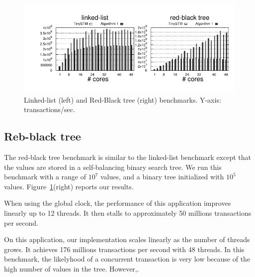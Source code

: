 \begin{figure}[!t]
	\centering
	\includegraphics[scale = 1.0]{results/intset/ll-rb.pdf}
	\caption{Linked-list (left) and Red-Black tree (right) benchmarks. Y-axis: transactions/sec. \label{fig:benchmarking:llrb}}
\end{figure}

\subsection{Reb-black tree}

The red-black tree benchmark is similar to the linked-list benchmark except that the values are stored in a self-balancing binary search tree. 
We run this benchmark with a range of $10^7$ values, and a binary tree initialized with $10^5$ values.
Figure~\ref{fig:benchmarking:llrb}(right) reports our results.

When using the global clock, the performance of this application improves linearly up to 12 threads. 
It then stalls to approximately 50 millions transactions per second.

On this application, our implementation scales linearly as the number of threads grows. 
It achieves 176 millions transactions per second with 48 threads.
%
In this benchmark, the likelyhood of a concurrent transaction is very low because of the high number of values in the tree. However,.
%
